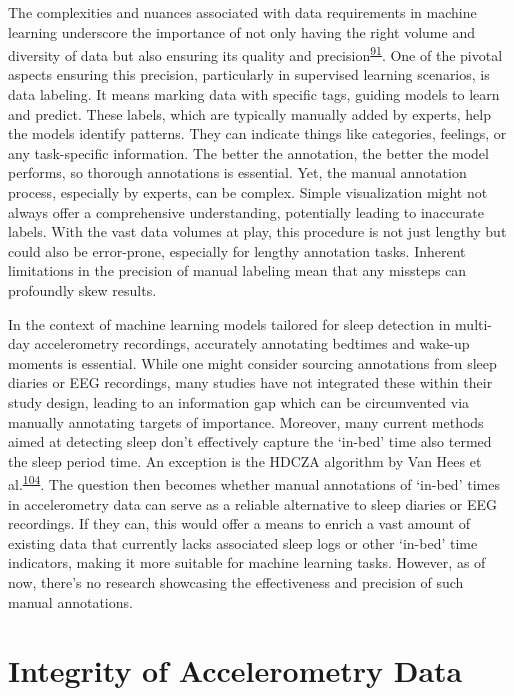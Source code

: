 \documentclass[
  10pt,
]{scrbook}
\begin{document}
The complexities and nuances associated with data requirements in
machine learning underscore the importance of not only having the right
volume and diversity of data but also ensuring its quality and
precision\textsuperscript{\protect\hyperlink{ref-Goodfellow-et-al-2016}{91}}.
One of the pivotal aspects ensuring this precision, particularly in
supervised learning scenarios, is data labeling. It means marking data
with specific tags, guiding models to learn and predict. These labels,
which are typically manually added by experts, help the models identify
patterns. They can indicate things like categories, feelings, or any
task-specific information. The better the annotation, the better the
model performs, so thorough annotations is essential. Yet, the manual
annotation process, especially by experts, can be complex. Simple
visualization might not always offer a comprehensive understanding,
potentially leading to inaccurate labels. With the vast data volumes at
play, this procedure is not just lengthy but could also be error-prone,
especially for lengthy annotation tasks. Inherent limitations in the
precision of manual labeling mean that any missteps can profoundly skew
results.

In the context of machine learning models tailored for sleep detection
in multi-day accelerometry recordings, accurately annotating bedtimes
and wake-up moments is essential. While one might consider sourcing
annotations from sleep diaries or EEG recordings, many studies have not
integrated these within their study design, leading to an information
gap which can be circumvented via manually annotating targets of
importance. Moreover, many current methods aimed at detecting sleep
don't effectively capture the `in-bed' time also termed the sleep period
time. An exception is the HDCZA algorithm by Van Hees et
al.\textsuperscript{\protect\hyperlink{ref-van_hees_estimating_2018}{104}}.
The question then becomes whether manual annotations of `in-bed' times
in accelerometry data can serve as a reliable alternative to sleep
diaries or EEG recordings. If they can, this would offer a means to
enrich a vast amount of existing data that currently lacks associated
sleep logs or other `in-bed' time indicators, making it more suitable
for machine learning tasks. However, as of now, there's no research
showcasing the effectiveness and precision of such manual annotations.

\hypertarget{integrity-of-accelerometry-data}{%
\section{Integrity of Accelerometry
Data}\label{integrity-of-accelerometry-data}}
\end{document}
